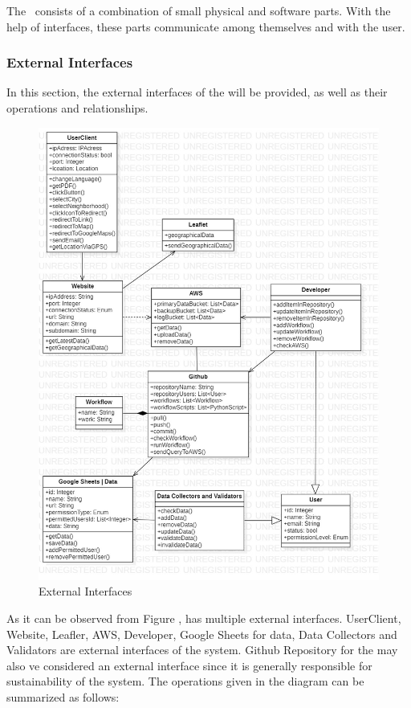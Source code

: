 The \afetbilgi\ consists of a combination of small physical and software parts. With the help of interfaces, these parts communicate among themselves and with the user.

\subsubsection{External Interfaces}

In this section, the external interfaces of the \afetbilgi will be provided, as well as their operations and relationships.

\begin{figure}[H]
  \centering
  \includegraphics[width=\linewidth]{img/external-interfaces-diagram.jpg}
  \caption{External Interfaces}
\end{figure}

As it can be observed from Figure , \afetbilgi has multiple external interfaces. UserClient, Website, Leafler, AWS, Developer, Google Sheets for data, Data Collectors and Validators are external interfaces of the system. Github Repository for the \afetbilgi may also ve considered an external interface since it is generally responsible for sustainability of the system. The operations given in the diagram can be summarized as follows:

